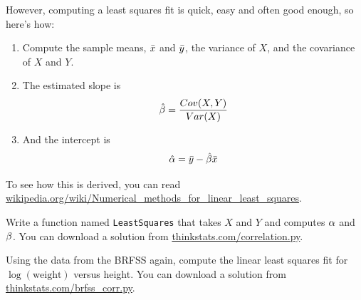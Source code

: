 \documentclass[12pt]{book}
\begin{document}
However, computing a least squares fit is quick, easy and often good
enough, so here's how:

\begin{enumerate}

\item Compute the sample means, $\bar{x}$ and $\bar{y}$, the variance
of $X$, and the covariance of $X$ and $Y$.

\item The estimated slope is
%
\[ \hat{\beta} = \frac{Cov(X,Y)}{Var(X)} \]
%
\item And the intercept is
%
\[ \hat{\alpha} = \bar{y} - \hat{\beta} \bar{x} \]
%
\end{enumerate}

To see how this is derived, you can read
\url{wikipedia.org/wiki/Numerical_methods_for_linear_least_squares}.


\begin{ex}

Write a function named {\tt LeastSquares} that takes $X$ and $Y$ and
computes $\alpha$ and $\beta$.  You can download a solution from
\url{thinkstats.com/correlation.py}.

\end{ex}

\begin{ex}


Using the data from the BRFSS again, compute the linear least squares
fit for $\log(\mathrm{weight})$ versus height.  You can download a
solution from \url{thinkstats.com/brfss_corr.py}.

\end{ex}
\end{document}
